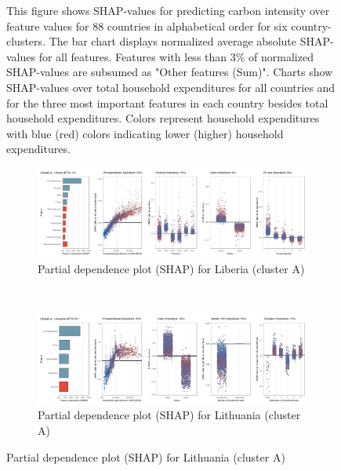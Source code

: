 \begin{figure}[ht!]
    \begin{subcaption2}
     This figure shows SHAP-values for predicting carbon intensity over feature values for 88 countries in alphabetical order for six country-clusters. The bar chart displays normalized average absolute SHAP-values for all features. Features with less than 3\% of normalized SHAP-values are subsumed as "Other features (Sum)". Charts show SHAP-values over total household expenditures for all countries and for the three most important features in each country besides total household expenditures. Colors represent household expenditures with blue (red) colors indicating lower (higher) household expenditures.
     \end{subcaption2}
\end{figure}

\begin{figure}[ht!]\ContinuedFloat
    \centering
   \begin{subfigure}[b]{\textwidth}      
         \centering
         \caption{Partial dependence plot (SHAP) for Liberia (cluster A)}
         \label{fig:5b_LBR}
         \includegraphics[width=\textwidth]{Figure 5b/Figure_5b_LBR} 
         \end{subfigure}
    \\
    \vspace{0.5cm}
    \begin{subfigure}[b]{\textwidth}
         \centering
         \caption{Partial dependence plot (SHAP) for Lithuania (cluster A)}
         \label{fig:5b_LTU}
         \includegraphics[width=\textwidth]{Figure 5b/Figure_5b_LTU}
         \end{subfigure}

\end{figure}
